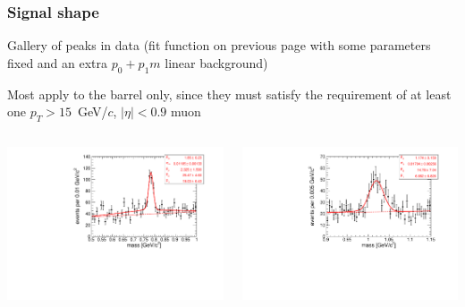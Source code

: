 \documentclass[compress]{beamer}
\begin{document}
\begin{frame}
\frametitle{Signal shape}

Gallery of peaks in data (fit function on previous page with some
parameters fixed and an extra $p_0 + p_1 m$ linear background)

\vfill Most apply to the barrel only, since they must satisfy the
requirement of at least one $p_T > 15$~GeV/$c$, $|\eta| < 0.9$ muon

\vfill
\begin{columns}
\includegraphics[width=\linewidth]{respeak_omega.pdf}

\includegraphics[width=\linewidth]{respeak_phi.pdf}


\end{columns}
\end{frame}
\end{document}
